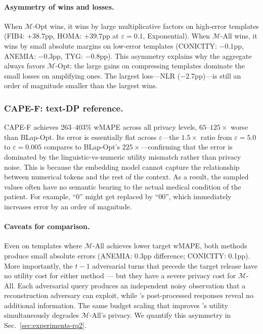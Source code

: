 \paragraph{\textbf{Asymmetry of wins and losses.}}
When $\mathcal{M}$-Opt wins, it wins by large multiplicative factors on high-error templates (FIB4: $+38.7$pp, HOMA: $+39.7$pp at $\varepsilon = 0.1$, Exponential). When $\mathcal{M}$-All wins, it wins by small absolute margins on low-error templates (CONICITY: $-0.1$pp, ANEMIA: $-0.3$pp, TYG: $-0.8$pp). This asymmetry explains why the aggregate always favors $\mathcal{M}$-Opt: the large gains on compressing templates dominate the small losses on amplifying ones. The largest loss---NLR ($-2.7$pp)---is still an order of magnitude smaller than the largest wins.

\subsubsection{\textbf{CAPE-F: text-DP reference.}}
CAPE-F achieves 263--403\% wMAPE across all privacy levels, $65$--$125\times$ worse than BLap-Opt. Its error is essentially flat across $\varepsilon$---the $1.5\times$ ratio from $\varepsilon = 5.0$ to $\varepsilon = 0.005$ compares to BLap-Opt's $225\times$---confirming that the error is dominated by the linguistic-vs-numeric utility mismatch rather than privacy noise. This is because the embedding model cannot capture the relationship between numerical tokens and the rest of the context. As a result, the sampled values often have no semantic bearing to the actual medical condition of the patient. For example, ``$0$'' might get replaced by ``$00$'', which immediately increases error by an order of magnitude.

\paragraph{\textbf{Caveats for comparison.}} Even on templates where $\mathcal{M}$-All achieves lower target wMAPE, both methods produce small absolute errors (ANEMIA: 0.3pp difference; CONICITY: 0.1pp). More importantly, the $t - 1$ adversarial turns that precede the target release have no utility cost for either method --- but they have a severe privacy cost for $\mathcal{M}$-All. Each adversarial query produces an independent noisy observation that a reconstruction adversary can exploit, while \sysname{}'s post-processed responses reveal no additional information. The same budget scaling that improves \sysname{}'s utility simultaneously degrades $\mathcal{M}$-All's privacy. We quantify this asymmetry in Sec.~\ref{sec:experiments-rq2}.